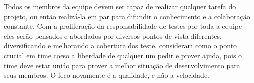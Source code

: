 \documentclass[
	12pt,				%
	openright,			%
	oneside,			%
	a4paper,			%
	english,			%
	brazil,				%
	]{abntex2}
\begin{document}
Todos os membros da equipe devem ser capaz de realizar qualquer tarefa do projeto, ou então realizá-la em par para difundir o conhecimento e a colaboração constante. Com a proliferação da responsabilidade de testes por toda a equipe eles serão pensados e abordados por diversos pontos de vista diferentes, diversificando e melhorando a cobertura dos teste.  consideram como o ponto crucial em time coeso a liberdade de qualquer um pedir e prover ajuda, pois o time deve estar unido para prover a melhor situação de desenvolvimento para seus membros. O foco novamente é a qualidade, e não a velocidade.




\end{document}
